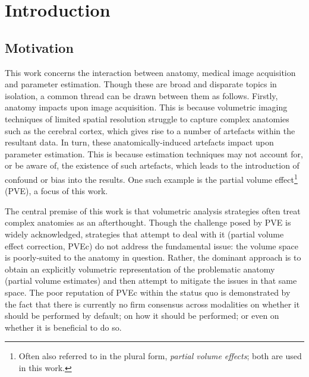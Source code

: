  

\chapter{Introduction}

\section{Motivation}

This work concerns the interaction between anatomy, medical image acquisition and parameter estimation. Though these are broad and disparate topics in isolation, a common thread can be drawn between them as follows. Firstly, anatomy impacts upon image acquisition. This is because volumetric imaging techniques of limited spatial resolution struggle to capture complex anatomies such as the cerebral cortex, which gives rise to a number of artefacts within the resultant data. In turn, these anatomically-induced artefacts impact upon parameter estimation. This is because estimation techniques may not account for, or be aware of, the existence of such artefacts, which leads to the introduction of confound or bias into the results. One such example is the partial volume effect\footnote{Often also referred to in the plural form, \textit{partial volume effects}; both are used in this work.} (PVE), a focus of this work. 

The central premise of this work is that volumetric analysis strategies often treat complex anatomies as an afterthought. Though the challenge posed by PVE is widely acknowledged, strategies that attempt to deal with it (partial volume effect correction, PVEc) do not address the fundamental issue: the volume space is poorly-suited to the anatomy in question. Rather, the dominant approach is to obtain an explicitly volumetric representation of the problematic anatomy (partial volume estimates) and then attempt to mitigate the issues in that same space. The poor reputation of PVEc within the status quo is demonstrated by the fact that there is currently no firm consensus across modalities on whether it should be performed by default; on how it should be performed; or even on whether it is beneficial to do so. 

